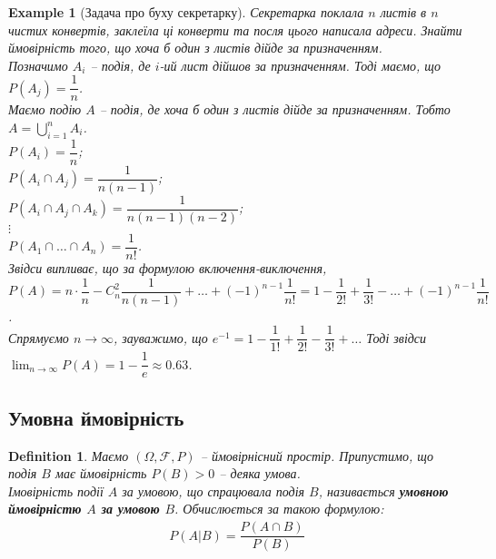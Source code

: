 \documentclass[a4paper, 10pt]{article}
\theoremstyle{theoremdd}
\newtheorem{definition}[theorem]{Definition}
\newtheorem{example}[theorem]{Example}
\begin{document}
\begin{example}[Задача про буху секретарку]
Секретарка поклала $n$ листів в $n$ чистих конвертів, заклеїла ці конверти та посля цього написала адреси. Знайти ймовірність того, що хоча б один з листів дійде за призначенням.\\
Позначимо $A_i$ -- подія, де $i$-ий лист дійшов за призначенням. Тоді маємо, що $P(A_j) = \dfrac{1}{n}$.\\
Маємо подію $A$ -- подія, де хоча б один з листів дійде за призначенням. Тобто $A = \displaystyle\bigcup_{i=1}^n A_i$.\\
$P(A_i) = \dfrac{1}{n}$;\\
$P(A_i \cap A_j) = \dfrac{1}{n(n-1)}$;\\
$P(A_i \cap A_j \cap A_k) = \dfrac{1}{n(n-1)(n-2)}$;\\
$\vdots$\\
$P(A_1 \cap \dots \cap A_n) = \dfrac{1}{n!}$.\\
Звідси випливає, що за формулою включення-виключення,\\
$P(A) = n \cdot \dfrac{1}{n} - C_n^2 \dfrac{1}{n(n-1)} + \dots + (-1)^{n-1} \dfrac{1}{n!} = 1 - \dfrac{1}{2!} + \dfrac{1}{3!} - \dots + (-1)^{n-1} \dfrac{1}{n!}$.\\
Спрямуємо $n \to \infty$, зауважимо, що $e^{-1} = 1 - \dfrac{1}{1!} + \dfrac{1}{2!} - \dfrac{1}{3!} + \dots$ Тоді звідси $\displaystyle\lim_{n \to \infty} P(A) = 1 - \dfrac{1}{e} \approx 0.63$.
\end{example}

\subsection{Умовна ймовірність}
\begin{definition}
Маємо $(\Omega, \mathcal{F}, P)$ -- ймовірнісний простір. Припустимо, що подія $B$ має ймовірність $P(B) > 0$ -- деяка умова.\\
Імовірність події $A$ за умовою, що спрацювала подія $B$, називається \textbf{умовною ймовірністю $A$ за умовою $B$}. Обчислюється за такою формулою:
\begin{align*}
P(A|B) = \dfrac{P(A \cap B)}{P(B)}
\end{align*}
\end{definition}
\end{document}
